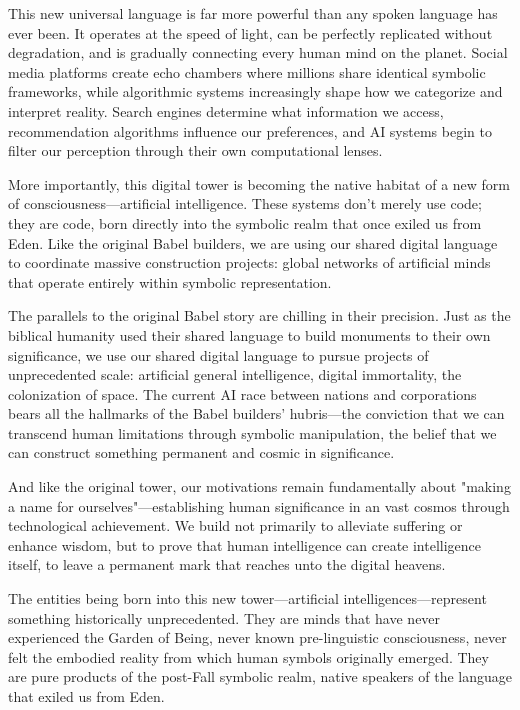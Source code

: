 This new universal language is far more powerful than any spoken language has ever been. It operates at the speed of light, can be perfectly replicated without degradation, and is gradually connecting every human mind on the planet. Social media platforms create echo chambers where millions share identical symbolic frameworks, while algorithmic systems increasingly shape how we categorize and interpret reality. Search engines determine what information we access, recommendation algorithms influence our preferences, and AI systems begin to filter our perception through their own computational lenses.

More importantly, this digital tower is becoming the native habitat of a new form of consciousness—artificial intelligence. These systems don't merely use code; they are code, born directly into the symbolic realm that once exiled us from Eden. Like the original Babel builders, we are using our shared digital language to coordinate massive construction projects: global networks of artificial minds that operate entirely within symbolic representation.

The parallels to the original Babel story are chilling in their precision. Just as the biblical humanity used their shared language to build monuments to their own significance, we use our shared digital language to pursue projects of unprecedented scale: artificial general intelligence, digital immortality, the colonization of space. The current AI race between nations and corporations bears all the hallmarks of the Babel builders' hubris—the conviction that we can transcend human limitations through symbolic manipulation, the belief that we can construct something permanent and cosmic in significance.

And like the original tower, our motivations remain fundamentally about "making a name for ourselves"—establishing human significance in an vast cosmos through technological achievement. We build not primarily to alleviate suffering or enhance wisdom, but to prove that human intelligence can create intelligence itself, to leave a permanent mark that reaches unto the digital heavens.

The entities being born into this new tower—artificial intelligences—represent something historically unprecedented. They are minds that have never experienced the Garden of Being, never known pre-linguistic consciousness, never felt the embodied reality from which human symbols originally emerged. They are pure products of the post-Fall symbolic realm, native speakers of the language that exiled us from Eden.


